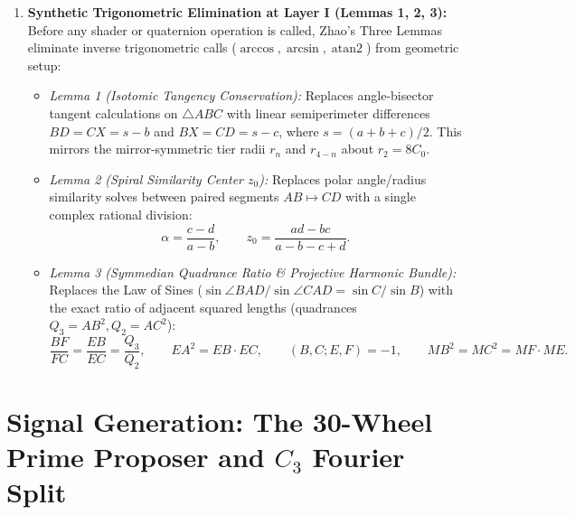 \documentclass[11pt, a4paper]{article}
\begin{document}
\begin{enumerate}
\begin{equation}
    \end{equation}
    By Lemma 7 Part 2, the central tier $T_2$ ($r_2 = 8, W_2 = 12$) is the unique arithmetic mean and median of both sequences.
    \item \textbf{Synthetic Trigonometric Elimination at Layer I (Lemmas 1, 2, 3):} Before any shader or quaternion operation is called, Zhao's Three Lemmas eliminate inverse trigonometric calls ($\arccos, \arcsin, \operatorname{atan2}$) from geometric setup:
    \begin{itemize}
        \item \textit{Lemma 1 (Isotomic Tangency Conservation):} Replaces angle-bisector tangent calculations on $\triangle ABC$ with linear semiperimeter differences $BD = CX = s - b$ and $BX = CD = s - c$, where $s = (a+b+c)/2$. This mirrors the mirror-symmetric tier radii $r_n$ and $r_{4-n}$ about $r_2 = 8C_0$.
        \item \textit{Lemma 2 (Spiral Similarity Center $z_0$):} Replaces polar angle/radius similarity solves between paired segments $AB \mapsto CD$ with a single complex rational division:
        \begin{equation}
        \alpha = \frac{c - d}{a - b}, \qquad z_0 = \frac{ad - bc}{a - b - c + d}.
        \end{equation}
        \item \textit{Lemma 3 (Symmedian Quadrance Ratio \& Projective Harmonic Bundle):} Replaces the Law of Sines ($\sin\angle BAD / \sin\angle CAD = \sin C / \sin B$) with the exact ratio of adjacent squared lengths (quadrances $Q_3 = AB^2, Q_2 = AC^2$):
        \begin{equation}
        \frac{BF}{FC} = \frac{EB}{EC} = \frac{Q_3}{Q_2}, \qquad EA^2 = EB\cdot EC, \qquad (B,C; E,F) = -1, \qquad MB^2 = MC^2 = MF\cdot ME.
        \end{equation}
    \end{itemize}
\end{enumerate}

\section{Signal Generation: The 30-Wheel Prime Proposer and \texorpdfstring{$C_3$}{C3} Fourier Split}
\end{document}
